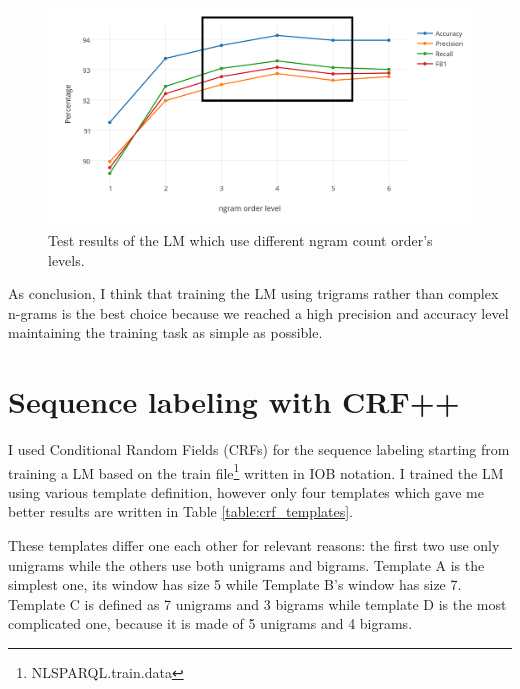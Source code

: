 \documentclass[a4paper,7pt,oneside]{book}
\begin{document}
\begin{figure}[h]
  \centering
    \includegraphics[scale=1.2]{res/fst_ngram_count_levels_small_rect}
    \caption{Test results of the LM which use different ngram count order's levels.}
    \label{fig:fst_ngram_count_levels}
\end{figure}

\noindent
As conclusion, I think that training the LM using trigrams rather than complex n-grams is the best choice because we reached a high precision and accuracy level maintaining the training task as simple as possible.

\chapter{Sequence labeling with CRF++}

I used Conditional Random Fields (CRFs) for the sequence labeling starting from training a LM based on the train file\footnote{NLSPARQL.train.data} written in IOB notation. I trained the LM using various template definition, however only four templates which gave me better results are written in Table \ref{table:crf_templates}.

These templates differ one each other for relevant reasons: the first two use only unigrams while the others use both unigrams and bigrams. Template A is the simplest one, its window has size 5 while Template B's window has size 7. Template C is defined as 7 unigrams and 3 bigrams while template D is the most complicated one, because it is made of 5 unigrams and 4 bigrams.
\end{document}
